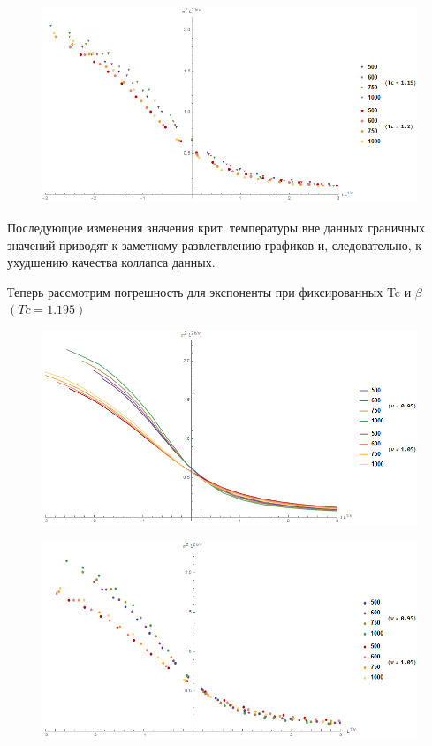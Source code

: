 \begin{figure}[!h]
    \centering
    \includegraphics[width=150mm]{Sections/Images/ErrTc2_3.png}
    \label{fig:ErrTc2_3}
\end{figure}

Последующие изменения значения крит. температуры вне данных граничных значений приводят к заметному развлетвлению графиков и, следовательно, к ухудшению качества коллапса данных.

Теперь рассмотрим погрешность для экспоненты при фиксированных Tc и $\beta$ $(Tc = 1.195)$

\begin{figure}[!h]
    \centering
    \includegraphics[width=150mm]{Sections/Images/ErrV2_1.png}
    \label{fig:ErrV2_1}
\end{figure}

\begin{figure}[!h]
    \centering
    \includegraphics[width=150mm]{Sections/Images/ErrV2_2.png}
    \label{fig:ErrV2_2}
\end{figure}


